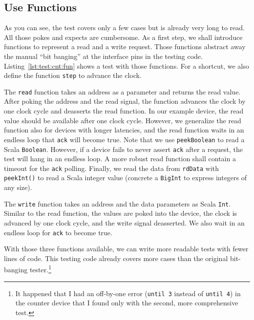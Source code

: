 \documentclass[%
    10pt,
    headinclude, footexclude,
    openright, %
    notitlepage,
    cleardoubleempty,
    headsepline,
    pointlessnumbers,
    bibtotoc, idxtotoc,
    ]{scrbook}
\newcommand{\code}[1]{{\lstinline[basicstyle=\small\ttfamily]{#1}}}
\begin{document}

\subsection{Use Functions}

As you can see, the test covers only a few cases but is already very long to read.
All those pokes and expects are cumbersome. As a first step, we shall introduce
functions to represent a read and a write request. Those functions abstract away the manual
``bit banging'' at the interface pins in the testing code.
Listing~\ref{lst:test:cnt:fun} shows a test with those functions. For a shortcut, we also define
the function \code{step} to advance the clock.


The \code{read} function takes an address
as a parameter and returns the read value. After poking the address and the read signal, the function
advances the clock by one clock cycle and deasserts the read function. In our example device,
the read value should be available after one clock cycle. However, we generalize the read function
also for devices with longer latencies, and the read function waits in an endless loop that \code{ack}
will become true. Note that we use \code{peekBoolean} to read a Scala \code{Boolean}.
However, if a device fails to never assert \code{ack} after a request,
the test will hang in an endless loop. A more robust read function shall contain a timeout for the \code{ack}
polling. Finally, we read the data from \code{rdData} with \code{peekInt()} to read a Scala integer
value (concrete a \code{BigInt} to express integers of any size).

The \code{write} function takes an address and the data parameters as Scala \code{Int}.
Similar to the read function, the values are poked into the device, the clock is advanced by one
clock cycle, and the write signal deasserted. We also wait in an endless loop for
\code{ack} to become true.

With those three functions available, we can write more readable tests with fewer lines of code.
This testing code already covers more cases than the original bit-banging
tester.\footnote{It happened that I had an off-by-one error (\code{until 3} instead of \code{until 4})
in the counter device that I found only with the second, more comprehensive test.}
\end{document}
